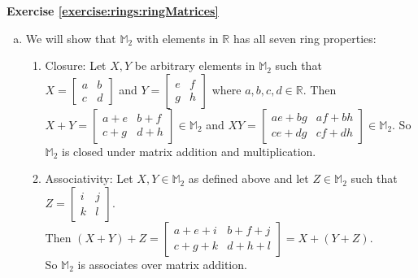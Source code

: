 \noindent\textbf{Exercise \ref{exercise:rings:ringMatrices}}
\begin{enumerate}[(a)]
\item We will show that ${\mathbb M}_2$ with elements in ${\mathbb R}$ has all seven ring properties:
\begin{enumerate}[(1)]
    \item Closure:  Let $X,Y$ be arbitrary elements in ${\mathbb M}_2$ such that\\
    $X=
\begin{bmatrix}
a & b\\
c & d
\end{bmatrix}$
and $Y=
\begin{bmatrix}
e & f\\
g & h
\end{bmatrix}$
where $a,b,c,d\in{\mathbb R}$.  Then\\
$X+Y=
\begin{bmatrix}
a+e & b+f\\
c+g & d+h
\end{bmatrix}
\in{\mathbb M}_2$ and $XY=
\begin{bmatrix}
ae+bg & af+bh\\
ce+dg & cf+dh
\end{bmatrix}
\in{\mathbb M}_2$.  So ${\mathbb M}_2$ is closed under matrix addition and multiplication.
\item Associativity:  Let $X,Y\in{\mathbb M}_2$ as defined above and let $Z\in{\mathbb M}_2$ such that $Z=
\begin{bmatrix}
i & j\\
k & l
\end{bmatrix}$.\\  
Then $(X+Y)+Z=
\begin{bmatrix}
a+e+i & b+f+j\\
c+g+k & d+h+l
\end{bmatrix}
=X+(Y+Z)$.\\  
So ${\mathbb M}_2$ is associates over matrix addition.\\


\end{enumerate}
\end{enumerate}
